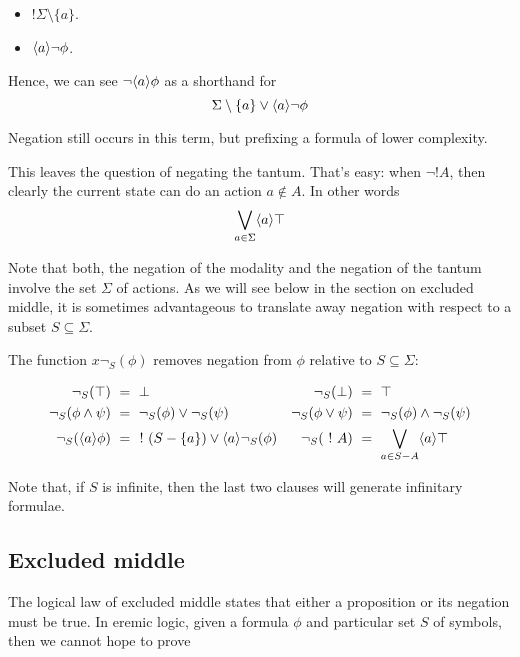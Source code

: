 \begin{itemize}

\item $!\Sigma \setminus \{a\}$.

\item $\langle a \rangle \neg \phi$.

\end{itemize}

\NI Hence, we can see $\neg \langle a \rangle \phi$ as a shorthand for 
\[
   \Sigma \setminus \{a\} \lor \langle a \rangle \neg \phi
\]

\NI Negation still occurs in this term, but prefixing a formula of
lower complexity.

This leaves the question of negating the tantum. That's easy: when
$\neg !A$, then clearly the current state can do an action $a \notin
A$. In other words
\[
   \bigvee_{a \in \Sigma}\langle a \rangle \top
\]

\NI Note that both, the negation of the modality and the negation of
the tantum involve the set $\Sigma$ of actions. As we will see below in the section
on excluded middle, it is sometimes advantageous to translate away negation with respect to 
a subset $S \subseteq \Sigma$. 

\begin{definition}
The function $x \neg_{S}(\phi)$ removes negation from $\phi$
relative to $S \subseteq \Sigma$:

\begin{align*}
  \neg_{S}(\top) &\ =\  \bot  &
  \neg_S(\bot) &\ =\  \top  \\
  \neg_S(\phi \land \psi) &\ =\  \neg_S(\phi) \lor \neg_S(\psi)  &
  \neg_S(\phi \lor \psi) &\ =\  \neg_S(\phi) \land \neg_S(\psi)  \\
  \neg_S(\langle a \rangle \phi) &\ =\  \ ! \ (S-\{a\}) \lor \langle a \rangle \neg_S(\phi)  &
  \neg_S(\ ! \  A) &\ =\  \bigvee_{a \in S - A} \langle a \rangle \top
\end{align*}


\end{definition}

\NI Note that, if $S$ is infinite, then the last two clauses will generate infinitary formulae.

\subsection{Excluded middle}

The logical law of excluded middle states that either a proposition or
its negation must be true. In eremic logic, 
given a formula $\phi$ and particular set $S$ of symbols, then we
cannot hope to prove

